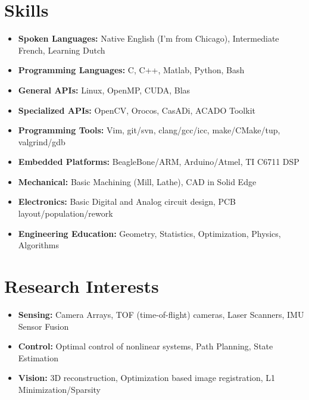 \documentclass[line,lm,rm,11pt]{res} %
\def\spaceline{\vspace{1mm} \fullline}
\begin{document}
\begin{resume}
\section{Skills}
	\begin{itemize}
	\item 
	\spaceline
{\bf Spoken Languages: } Native English (I'm from Chicago), Intermediate French,  Learning Dutch
\item {\bf Programming Languages: } C, C++, Matlab, Python, Bash
\item {\bf General APIs: } Linux, OpenMP, CUDA, Blas
\item {\bf Specialized APIs: } OpenCV, Orocos, CasADi, ACADO Toolkit
\item {\bf Programming Tools: } Vim, git/svn, clang/gcc/icc, make/CMake/tup, valgrind/gdb
\item {\bf Embedded Platforms: } BeagleBone/ARM, Arduino/Atmel, TI C6711 DSP
\item {\bf Mechanical: } Basic Machining (Mill, Lathe), CAD in Solid Edge
\item {\bf Electronics: } Basic Digital and Analog circuit design, PCB layout/population/rework
\item {\bf Engineering Education: } Geometry, Statistics, Optimization, Physics, Algorithms
\end{itemize}

\section{Research Interests}
\begin{itemize}
\item 
	\spaceline
	{\bf Sensing:} Camera Arrays, TOF (time-of-flight) cameras, Laser Scanners, IMU Sensor Fusion
\item 
	{\bf Control:} Optimal control of nonlinear systems, Path Planning, State Estimation
\item 
	{\bf Vision:} 3D reconstruction, Optimization based image registration, L1 Minimization/Sparsity
\end{itemize}


\end{resume}
\end{document}
